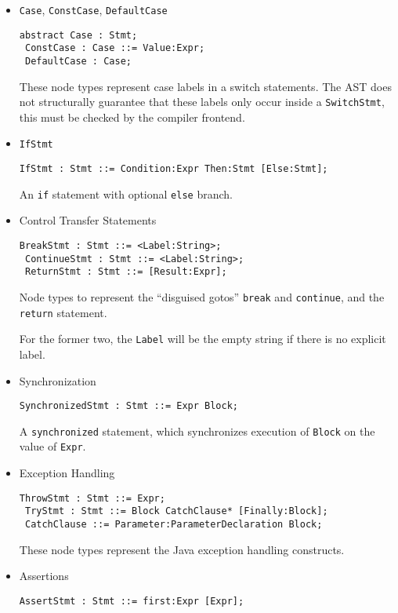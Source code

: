 \documentclass{article}
\newcommand{\nt}[1]{\texttt{#1}}
\newcommand{\child}[1]{\texttt{#1}}
\newcommand{\code}[1]{\lstinline$#1$}
\begin{document}
\begin{itemize}
\item \nt{Case}, \nt{ConstCase}, \nt{DefaultCase}
  \begin{lstlisting}[frame=single]
 abstract Case : Stmt;
 ConstCase : Case ::= Value:Expr;
 DefaultCase : Case;
  \end{lstlisting}

  These node types represent case labels in a switch statements. The AST
  does not structurally guarantee that these labels only occur inside
  a \nt{SwitchStmt}, this must be checked by the compiler frontend.

\item \nt{IfStmt}
  \begin{lstlisting}[frame=single]
 IfStmt : Stmt ::= Condition:Expr Then:Stmt [Else:Stmt];
  \end{lstlisting}

  An \code{if} statement with optional \code{else} branch.

\item Control Transfer Statements
  \begin{lstlisting}[frame=single]
 BreakStmt : Stmt ::= <Label:String>;
 ContinueStmt : Stmt ::= <Label:String>;
 ReturnStmt : Stmt ::= [Result:Expr];
  \end{lstlisting}

  Node types to represent the ``disguised gotos'' 
  \code{break} and \code{continue}, and the \code{return} statement.

  For the former two, the \child{Label} will be the empty string
  if there is no explicit label.

\item Synchronization
  \begin{lstlisting}[frame=single]
 SynchronizedStmt : Stmt ::= Expr Block;
  \end{lstlisting}

  A \code{synchronized} statement, which synchronizes execution
  of \nt{Block} on the value of \nt{Expr}.

\item Exception Handling
  \begin{lstlisting}[frame=single]
 ThrowStmt : Stmt ::= Expr;
 TryStmt : Stmt ::= Block CatchClause* [Finally:Block];
 CatchClause ::= Parameter:ParameterDeclaration Block;
  \end{lstlisting}

  These node types represent the Java exception handling constructs.

\item Assertions
  \begin{lstlisting}[frame=single]
 AssertStmt : Stmt ::= first:Expr [Expr];
  \end{lstlisting}


\end{itemize}
\end{document}
